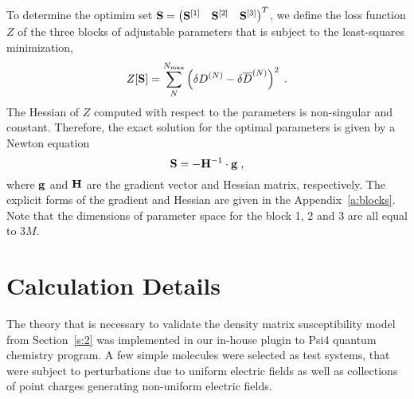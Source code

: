 \documentclass[aip,graphicx]{revtex4-1}
\begin{document}
To determine the optimim set 
$
 {\bf S} = 
\begin{pmatrix}
{\bf S}^{[1]} &
{\bf S}^{[2]} &
{\bf S}^{[3]}
\end{pmatrix}^T
$, we define the loss function $Z$ 
of the three blocks of adjustable parameters
that is subject to the least\hyp{}squares minimization,
%
\begin{equation}\label{e:Z}
 Z[{\bf S}] = \sum_N^{N_{\rm max}} \left( \delta D^{(N)} - \delta \overline{D}^{(N)} \right)^2 \;.
\end{equation}
%
The Hessian of $Z$ computed with respect to the parameters is non\hyp{}singular 
and constant.
Therefore, the exact solution for the optimal parameters is given by a Newton equation
%
\begin{equation}\label{e:Newton}
 {\bf S} = -{\bf H}^{-1} \cdot {\bf g} \;,
\end{equation}
%
where ${\bf g}$ and ${\bf H}$ are the gradient vector and Hessian matrix, respectively.
%
%
The explicit forms of the gradient and Hessian are given in the Appendix~\ref{a:blocks}.
Note that the dimensions of parameter space for the block 1, 2 and 3 are all
equal to $3M$.

\section{\label{s:3}Calculation Details}

The theory that is necessary to validate the density matrix susceptibility model from Section~\ref{s:2}
was implemented in our in\hyp{}house plugin to Psi4 quantum chemistry program.
A few simple molecules were selected as test systems, that were subject to 
perturbations due to uniform electric fields as well as collections of point charges
generating non\hyp{}uniform electric fields. 
\end{document}
